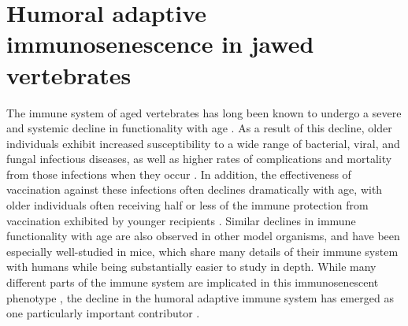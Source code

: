 \section{Humoral adaptive immunosenescence in jawed vertebrates}
\label{sec:intro_immunosenescence}

The immune system of aged vertebrates has long been known to undergo a severe and systemic decline in functionality with age \parencite{segre1977immunosenescence}. As a result of this decline, older individuals exhibit increased susceptibility to a wide range of bacterial, viral, and fungal infectious diseases, as well as higher rates of complications and mortality from those infections when they occur \parencite{sambhara2009vaccination}. In addition, the effectiveness of vaccination against these infections often declines dramatically with age, with older individuals often receiving half or less of the immune protection from vaccination exhibited by younger recipients \parencite{sambhara2009vaccination}. Similar declines in immune functionality with age are also observed in other model organisms, and have been especially well-studied in mice, which share many details of their immune system with humans while being substantially easier to study in depth. While many different parts of the immune system are implicated in this immunosenescent phenotype \parencite{kogut2012bcells}, the decline in the humoral adaptive immune system has emerged as one particularly important contributor \parencite{ademokun2010ageing}.

